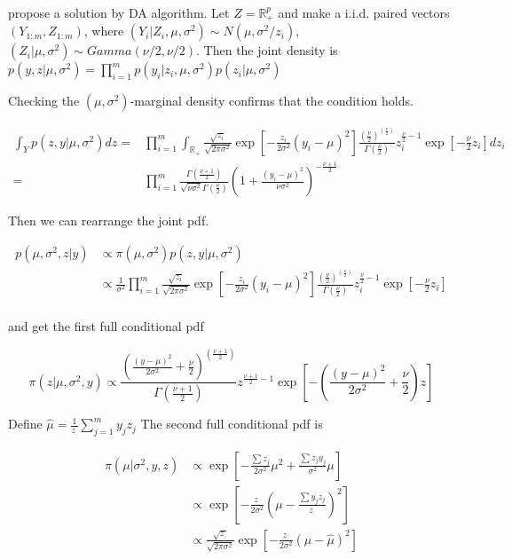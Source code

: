 \documentclass[12pt]{article}
\begin{document}
\citet{mengSeekingEfficientData1999} propose a solution by DA algorithm.
Let \(Z=\mathbb{R}^p_{+}\) and make a i.i.d. paired vectors
\((Y_{1:m},Z_{1:m})\), where
\((Y_{i}|Z_{i},\mu,\sigma^2)\sim N(\mu,\sigma^2/z_i)\),
\((Z_{i}|\mu,\sigma^2) \sim Gamma(\nu/2,\nu/2)\). Then the joint density
is
\(p(y,z|\mu,\sigma^2)=\prod_{i=1}^mp(y_i|z_i,\mu,\sigma^2)p(z_i|\mu,\sigma^2)\)

Checking the \((\mu,\sigma^2)\)-marginal density confirms that the
condition holds.

\[\begin{aligned}\int_Y p(z,y|\mu,\sigma^2)dz=&\prod_{i=1}^m\int_{\mathbb{R}_{+}}\frac{\sqrt{z_i}}{\sqrt{2\pi\sigma^2}}\exp\left[-\frac{z_i}{2\sigma^2}(y_i-\mu)^2\right]\frac{(\frac{\nu}2)^{(\frac{\nu}2)}}{\Gamma(\frac{\nu}2)}z_i^{\frac{\nu}2-1}\exp\left[-\frac{\nu}{2}z_i\right]dz_i\\
=&\prod_{i=1}^m\frac{\Gamma(\frac{\nu+1}2)}{\sqrt{\nu\sigma^2}\Gamma(\frac{\nu}2)}(1+\frac{(y_i-\mu)^2}{\nu\sigma^2})^{-\frac{\nu+1}2}\end{aligned}\]

Then we can rearrange the joint pdf.

\[\begin{aligned}
p(\mu,\sigma^2,z|y)&\propto\pi(\mu,\sigma^2)p(z,y|\mu,\sigma^2)\\
                     &\propto\frac{1}{\sigma^2}\prod_{i=1}^m\frac{\sqrt{z_i}}{\sqrt{2\pi\sigma^2}}\exp\left[-\frac{z_i}{2\sigma^2}(y_i-\mu)^2\right]\frac{(\frac{\nu}2)^{(\frac{\nu}2)}}{\Gamma(\frac{\nu}2)}z_i^{\frac{\nu}2-1}\exp\left[-\frac{\nu}{2}z_i\right]\\
\end{aligned}\]

and get the first full conditional pdf

\[ \pi(z|\mu,\sigma^2,y)\propto \frac{(\frac{(y-\mu)^2}{2\sigma^2}+\frac{\nu}{2})^{(\frac{\nu+1}2)}}{\Gamma(\frac{\nu+1}2)}z^{\frac{\nu+1}2-1}\exp\left[-\left(\frac{(y-\mu)^2}{2\sigma^2}+\frac{\nu}{2}\right)z\right]\]

Define \(\hat\mu=\frac{1}{z_{.}}\sum_{j=1}^my_jz_j\) The second full
conditional pdf is

\[\begin{aligned}
\pi(\mu|\sigma^2,y,z)&\propto\exp\left[-\frac{\sum z_j}{2\sigma^2}\mu^2+\frac{\sum z_jy_j}{\sigma^2}\mu\right]\\
&\propto\exp\left[-\frac{z_.}{2\sigma^2}(\mu-\frac{\sum y_jz_j}{z_{.}})^2\right]\\
&\propto\frac{\sqrt{z_.}}{\sqrt{2\pi\sigma^2}}\exp\left[-\frac{z_.}{2\sigma^2}(\mu-\hat\mu)^2\right]
\end{aligned}\]
\end{document}

